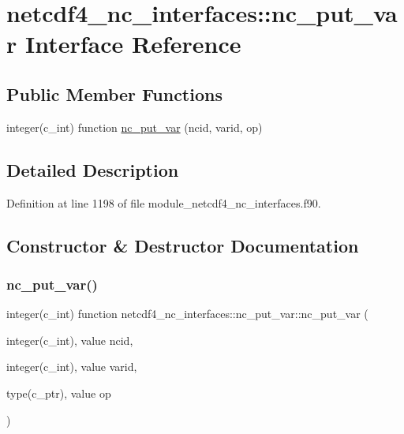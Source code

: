 \hypertarget{interfacenetcdf4__nc__interfaces_1_1nc__put__var}{}\section{netcdf4\+\_\+nc\+\_\+interfaces\+:\+:nc\+\_\+put\+\_\+var Interface Reference}
\label{interfacenetcdf4__nc__interfaces_1_1nc__put__var}
\subsection*{Public Member Functions}
\begin{DoxyCompactItemize}
\item 
integer(c\+\_\+int) function \hyperlink{interfacenetcdf4__nc__interfaces_1_1nc__put__var_ad2609aefae2f8506eacda5d5284fe7e2}{nc\+\_\+put\+\_\+var} (ncid, varid, op)
\end{DoxyCompactItemize}


\subsection{Detailed Description}


Definition at line 1198 of file module\+\_\+netcdf4\+\_\+nc\+\_\+interfaces.\+f90.



\subsection{Constructor \& Destructor Documentation}
\mbox{\label{interfacenetcdf4__nc__interfaces_1_1nc__put__var_ad2609aefae2f8506eacda5d5284fe7e2}} 
\subsubsection{\texorpdfstring{nc\+\_\+put\+\_\+var()}{nc\_put\_var()}}
{\footnotesize\ttfamily integer(c\+\_\+int) function netcdf4\+\_\+nc\+\_\+interfaces\+::nc\+\_\+put\+\_\+var\+::nc\+\_\+put\+\_\+var (\begin{DoxyParamCaption}\item[{integer(c\+\_\+int), value}]{ncid,  }\item[{integer(c\+\_\+int), value}]{varid,  }\item[{type(c\+\_\+ptr), value}]{op }\end{DoxyParamCaption})}



